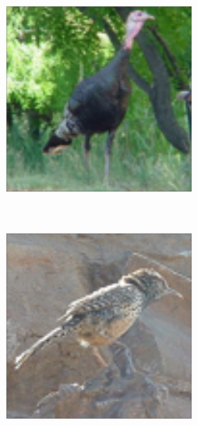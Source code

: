 \documentclass[times, utf8, proizvoljni, numeric]{fer}
\newcommand{\rulesep}{\unskip\ \vrule\ }
\begin{document}
\begin{figure}[ht!]
\begin{subfigure}[t]{0.19\textwidth}
		\includegraphics[width=\textwidth,height=\textwidth ]{./imgs/demo-preporucitelja-po-sadrzaju/tijek-rada/id@2.png}
	\end{subfigure}
	\rulesep
	\begin{subfigure}[t]{0.19\textwidth}
		\includegraphics[width=\textwidth,height=\textwidth]{./imgs/demo-preporucitelja-po-sadrzaju/tijek-rada/id@4391.png}

\end{subfigure}
\end{figure}
\end{document}
